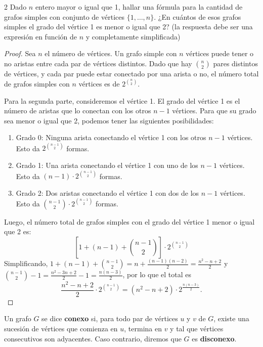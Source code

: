 \begin{ejercicio}{2}
    Dado \( n \) entero mayor o igual que 1, hallar una fórmula para la cantidad de grafos simples con conjunto de vértices \( \{1,\dots, n\} \). ¿En cuántos de esos grafos simples el grado del vértice 1 es menor o igual que 2? (la respuesta debe ser una expresión en función de \( n \) y completamente simplificada)
\end{ejercicio}
\begin{proof}
    Sea \( n \) el número de vértices. Un grafo simple con \( n \) vértices puede tener o no aristas entre cada par de vértices distintos. Dado que hay \( \binom{n}{2} \) pares distintos de vértices, y cada par puede estar conectado por una arista o no, el número total de grafos simples con \( n \) vértices es de \( 2^{\binom{n}{2}} \).

    Para la segunda parte, consideremos el vértice 1. El grado del vértice 1 es el número de aristas que lo conectan con los otros \( n-1 \) vértices. Para que su grado sea menor o igual que 2, podemos tener las siguientes posibilidades:
    \begin{enumerate}
        \item Grado 0: Ninguna arista conectando el vértice 1 con los otros \( n-1 \) vértices. Esto da \( 2^{\binom{n-1}{2}} \) formas.
        \item Grado 1: Una arista conectando el vértice 1 con uno de los \( n-1 \) vértices. Esto da \( (n-1) \cdot 2^{\binom{n-1}{2}} \) formas.
        \item Grado 2: Dos aristas conectando el vértice 1 con dos de los \( n-1 \) vértices. Esto da \( \binom{n-1}{2} \cdot 2^{\binom{n-1}{2}} \) formas.
    \end{enumerate}
    Luego, el número total de grafos simples con el grado del vértice 1 menor o igual que 2 es:
    \[
        \left [ 1 + (n-1) + \binom{n-1}{2} \right] \cdot 2^{\binom{n-1}{2}}
    \]
    Simplificando, \( 1 + (n-1) + \binom{n-1}{2} = n + \frac{(n-1)(n-2)}{2} = \frac{n^2 - n + 2}{2} \) y \( \binom{n-1}{2} - 1 = \frac{n^2-3n+2}{2} - 1 = \frac{n(n-3)}{2} \), por lo que el total es
    \[
        \frac{n^2 - n + 2}{2} \cdot 2^{\binom{n-1}{2}} = \left( n^2 - n + 2 \right) \cdot 2^{\frac{n(n-3)}{2}}.
    \]
\end{proof}

\begin{definition}
    Un grafo \( G \) se dice \textbf{conexo} si, para todo par de vértices \( u \) y \( v \) de \( G \), existe una sucesión de vértices que comienza en \( u \), termina en \( v \) y tal que vértices consecutivos son adyacentes. Caso contrario, diremos que \( G \) es \textbf{disconexo}.
\end{definition}

